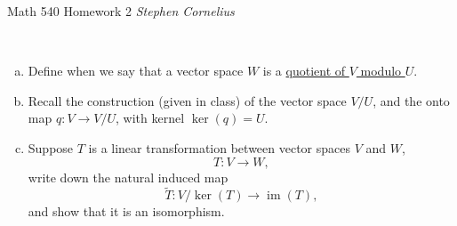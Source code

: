 \documentclass{article}
\begin{document}
\begin{center}
    Math 540
    \hfill Homework 2
    \hfill \textit{Stephen Cornelius}
\end{center}







\begin{problem} \\ 
   \begin{enumerate}[a)]
      \item Define when we say that a vector space $W$ is a \underline{quotient of $V$ modulo $U$}.
      \item Recall the construction (given in class) of the vector space $V/U$, and the onto map $q: V \to V/U$, with kernel $\ker(q) = U$.
      \item Suppose $T$ is a linear transformation between vector spaces $V$ and $W$, 
      \[
         T: V \to W,
      \]
      write down the natural induced map
      \[
         \tilde{T}: V/\ker(T) \to \operatorname{im}(T),
      \]
      and show that it is an isomorphism.
   \end{enumerate}
\end{problem}
\end{document}
